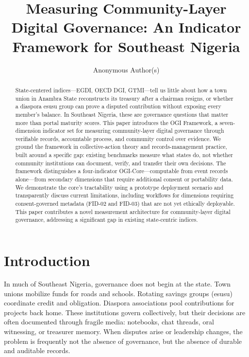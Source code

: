 \documentclass[sigconf,anonymous]{acmart}
\begin{document}
\title{Measuring Community-Layer Digital Governance: An Indicator Framework for Southeast Nigeria}

\author{Anonymous Author(s)}

\begin{abstract}
State-centered indices---EGDI, OECD DGI, GTMI---tell us little about how a town union in Anambra State reconstructs its treasury after a chairman resigns, or whether a diaspora esusu group can prove a disputed contribution without exposing every member's balance. In Southeast Nigeria, these are governance questions that matter more than portal maturity scores. This paper introduces the OGI Framework, a seven-dimension indicator set for measuring community-layer digital governance through verifiable records, accountable process, and community control over evidence. We ground the framework in collective-action theory and records-management practice, built around a specific gap: existing benchmarks measure what states do, not whether community institutions can document, verify, and transfer their own decisions. The framework distinguishes a four-indicator OGI-Core---computable from event records alone---from secondary dimensions that require additional consent or portability data. We demonstrate the core's tractability using a prototype deployment scenario and transparently discuss current limitations, including workflows for dimensions requiring consent-governed metadata (FID-02 and FID-03) that are not yet ethically deployable. This paper contributes a novel measurement architecture for community-layer digital governance, addressing a significant gap in existing state-centric indices.
\end{abstract}



\maketitle

\section{Introduction}

In much of Southeast Nigeria, governance does not begin at the state. Town unions mobilize funds for roads and schools. Rotating savings groups (esusu) coordinate credit and obligation. Diaspora associations pool contributions for projects back home. These institutions govern collectively, but their decisions are often documented through fragile media: notebooks, chat threads, oral witnessing, or treasurer memory. When disputes arise or leadership changes, the problem is frequently not the absence of governance, but the absence of durable and auditable records.
\end{document}
